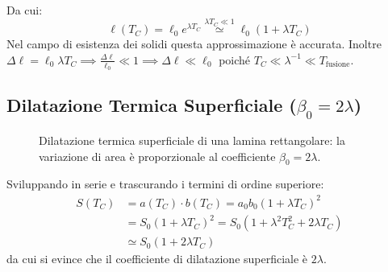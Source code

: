 Da cui:
\begin{equation}
\ell(T_C) = \ell_0 e^{\lambda T_C} \stackrel{\lambda T_C \ll 1}{\simeq} \ell_0 (1 + \lambda T_C)
\end{equation}
Nel campo di esistenza dei solidi questa approssimazione è accurata. 
Inoltre $\Delta \ell = \ell_0 \lambda T_C \implies \frac{\Delta \ell}{\ell_0} \ll 1 \implies \Delta \ell \ll \ell_0$ poiché $T_C \ll \lambda^{-1} \ll T_{\text{fusione}}$.

\subsection{Dilatazione Termica Superficiale ($\beta_0 = 2\lambda$)}
\begin{figure}[ht]
\centering
{}
\caption{Dilatazione termica superficiale di una lamina rettangolare: la variazione di area è proporzionale al coefficiente $\beta_0 = 2\lambda$.}
\end{figure}

Sviluppando in serie e trascurando i termini di ordine superiore:
\begin{align*}
S(T_C) &= a(T_C) \cdot b(T_C) = a_0 b_0 (1 + \lambda T_C)^2 \\
&= S_0 (1 + \lambda T_C)^2 = S_0 (1 + \lambda^2 T_C^2 + 2\lambda T_C) \\
&\simeq S_0 (1 + 2\lambda T_C)
\end{align*}
da cui si evince che il coefficiente di dilatazione superficiale è $2\lambda$.

